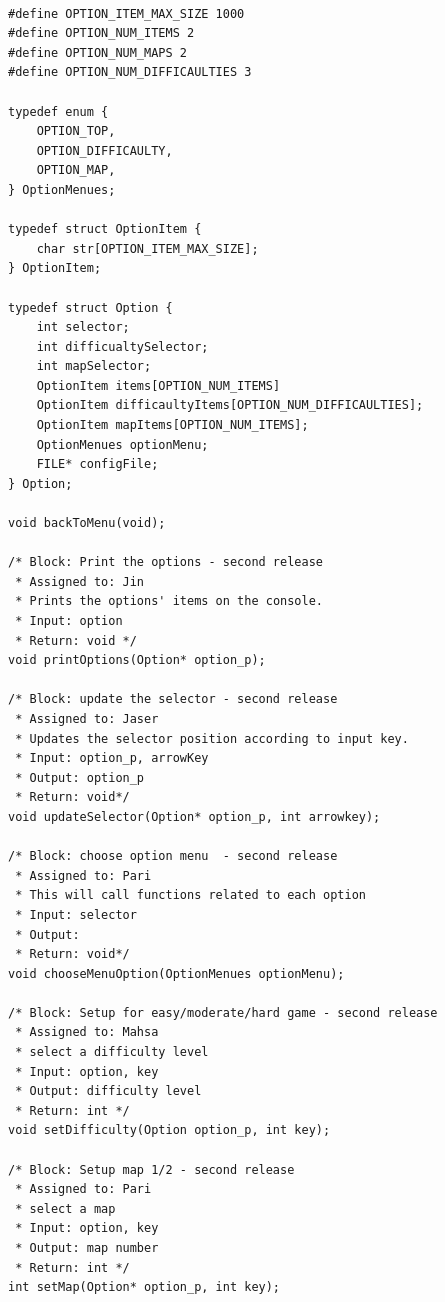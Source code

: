 \begin{verbatim}

#define OPTION_ITEM_MAX_SIZE 1000
#define OPTION_NUM_ITEMS 2
#define OPTION_NUM_MAPS 2
#define OPTION_NUM_DIFFICAULTIES 3

typedef enum {
    OPTION_TOP,
    OPTION_DIFFICAULTY,
    OPTION_MAP,
} OptionMenues;

typedef struct OptionItem {
    char str[OPTION_ITEM_MAX_SIZE];
} OptionItem;

typedef struct Option {
    int selector;
    int difficualtySelector;
    int mapSelector;
    OptionItem items[OPTION_NUM_ITEMS]
    OptionItem difficaultyItems[OPTION_NUM_DIFFICAULTIES];
    OptionItem mapItems[OPTION_NUM_ITEMS];
    OptionMenues optionMenu;
    FILE* configFile;
} Option;

void backToMenu(void);

/* Block: Print the options - second release
 * Assigned to: Jin
 * Prints the options' items on the console.
 * Input: option
 * Return: void */
void printOptions(Option* option_p);

/* Block: update the selector - second release
 * Assigned to: Jaser
 * Updates the selector position according to input key.
 * Input: option_p, arrowKey
 * Output: option_p
 * Return: void*/
void updateSelector(Option* option_p, int arrowkey);

/* Block: choose option menu  - second release
 * Assigned to: Pari
 * This will call functions related to each option
 * Input: selector
 * Output: 
 * Return: void*/
void chooseMenuOption(OptionMenues optionMenu);

/* Block: Setup for easy/moderate/hard game - second release
 * Assigned to: Mahsa
 * select a difficulty level
 * Input: option, key
 * Output: difficulty level
 * Return: int */
void setDifficulty(Option option_p, int key);

/* Block: Setup map 1/2 - second release
 * Assigned to: Pari
 * select a map
 * Input: option, key
 * Output: map number
 * Return: int */
int setMap(Option* option_p, int key);

\end{verbatim}